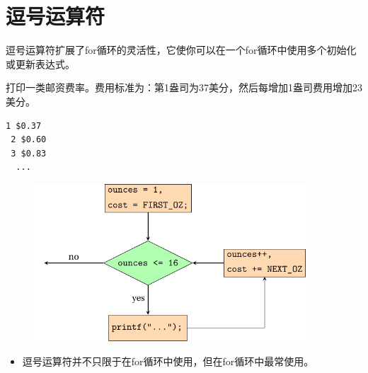 \section{逗号运算符}
\begin{frame}[fragile]\ft{\secname}
  逗号运算符扩展了for循环的灵活性，它使你可以在一个for循环中使用多个初始化或更新表达式。
\end{frame}

\begin{frame}[fragile]\ft{\secname}
  \begin{biancheng}
    打印一类邮资费率。费用标准为：第1盎司为37美分，然后每增加1盎司费用增加23美分。
  \end{biancheng}
\end{frame}

\begin{frame}[fragile]\ft{\secname}
      
\end{frame}

\begin{frame}[fragile]\ft{\secname}
\begin{lstlisting}[backgroundcolor=\color{red!10}]
 1 $0.37
 2 $0.60
 3 $0.83
  ...
\end{lstlisting}
\end{frame}


\begin{frame}[fragile]\ft{\secname}
\begin{figure}
\centering
\includegraphics[width=4in]{ch06/images/flowchart.pdf}
\end{figure}

\end{frame}


\begin{frame}[fragile]\ft{\secname}
\begin{itemize}
\item
 逗号运算符并不只限于在for循环中使用，但在for循环中最常使用。
\end{itemize}
\end{frame}


